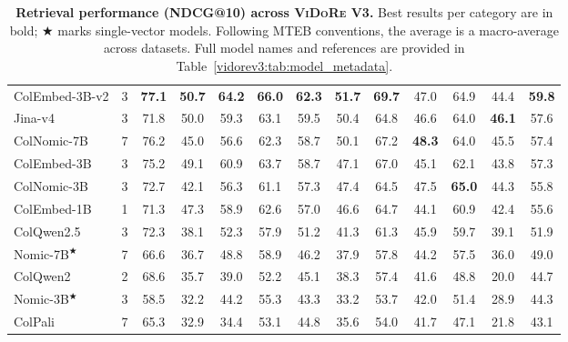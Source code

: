 \begin{table}[htbp]
{\begin{tabular}{l c c c c c c c c c c c >{\columncolor{avgcol}}c}
ColEmbed-3B-v2 & 3 & \textbf{77.1} & \textbf{50.7} & \textbf{64.2 }& \textbf{66.0} & \textbf{62.3} & \textbf{51.7} & \textbf{69.7} & 47.0 & 64.9 & 44.4 & \textbf{59.8} \\
Jina-v4 & 3 & 71.8 & 50.0 & 59.3 & 63.1 & 59.5 & 50.4 & 64.8 & 46.6 & 64.0 & \textbf{46.1} & 57.6 \\
ColNomic-7B & 7 & 76.2 & 45.0 & 56.6 & 62.3 & 58.7 & 50.1 & 67.2 & \textbf{48.3} & 64.0 & 45.5 & 57.4 \\
ColEmbed-3B & 3 & 75.2 & 49.1 & 60.9 & 63.7 & 58.7 & 47.1 & 67.0 & 45.1 & 62.1 & 43.8 & 57.3 \\
ColNomic-3B & 3 & 72.7 & 42.1 & 56.3 & 61.1 & 57.3 & 47.4 & 64.5 & 47.5 & \textbf{65.0} & 44.3 & 55.8 \\
ColEmbed-1B & 1 & 71.3 & 47.3 & 58.9 & 62.6 & 57.0 & 46.6 & 64.7 & 44.1 & 60.9 & 42.4 & 55.6 \\
ColQwen2.5 & 3 & 72.3 & 38.1 & 52.3 & 57.9 & 51.2 & 41.3 & 61.3 & 45.9 & 59.7 & 39.1 & 51.9 \\
Nomic-7B$^\bigstar$  & 7 & 66.6 & 36.7 & 48.8 & 58.9 & 46.2 & 37.9 & 57.8 & 44.2 & 57.5 & 36.0 & 49.0 \\
ColQwen2 & 2 & 68.6 & 35.7 & 39.0 & 52.2 & 45.1 & 38.3 & 57.4 & 41.6 & 48.8 & 20.0 & 44.7 \\
Nomic-3B$^\bigstar$ & 3 & 58.5 & 32.2 & 44.2 & 55.3 & 43.3 & 33.2 & 53.7 & 42.0 & 51.4 & 28.9 & 44.3 \\
ColPali & 7 & 65.3 & 32.9 & 34.4 & 53.1 & 44.8 & 35.6 & 54.0 & 41.7 & 47.1 & 21.8 & 43.1 \\
\bottomrule
\end{tabular}
}
\caption[Retriever performance across \textsc{ViDoRe} V3]{\textbf{Retrieval performance (NDCG@10) across \textsc{ViDoRe} V3.} Best results per category are in bold; \mbox{$\bigstar$} marks single-vector models. Following MTEB conventions, the average is a macro-average across datasets. Full model names and references are provided in Table~\ref{vidorev3:tab:model_metadata}.} %
\label{vidorev3:tab:retriever_comparison_updated}
\end{table}

